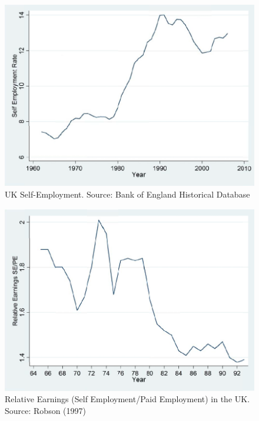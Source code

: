 \documentclass[
  a4paper,
  DIV=11,
  numbers=noendperiod]{scrartcl}
\begin{document}
\begin{figure}

{\centering \includegraphics{figures/figure-1.png}

}

\caption{\label{fig-figure-1}UK Self-Employment. Source: Bank of England
Historical Database}

\end{figure}

\begin{figure}

{\centering \includegraphics{figures/figure-2.png}

}

\caption{\label{fig-figure-2}Relative Earnings (Self Employment/Paid
Employment) in the UK. Source: Robson (1997)}

\end{figure}
\end{document}
